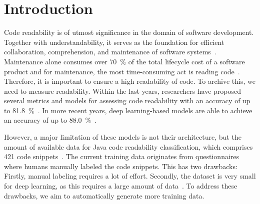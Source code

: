 \documentclass[%
class=scrreprt,
chapterprefix=false,%
open=right,%
twoside=false,%
paper=a4,%
logofile={Logo\_zentral\_farbig\_EN.png},%
thesistype=master,%
UKenglish,%
]{se2thesis}
\theoremstyle{definition}
\newcommand{\citeclassicmodels}{\cite{buse2009learning, posnett2011simpler, dorn2012general, scalabrino2018comprehensive}\xspace}
\newcommand{\citedeepmodels}{\cite{mi2018inception, mi2018improving, sharma2020egan, mi2022towards, mi2022rank, mi2023graph}\xspace}
\newcommand{\citeolddataset}{\cite{buse2009learning, dorn2012general, scalabrino2018comprehensive}\xspace}
\begin{document}
	\mainmatter
	
	\tableofcontents

\pagebreak
\section{Introduction} \label{Introduction}

	Code readability is of utmost significance in the domain of software development.
	Together with understandability, it serves as the foundation for efficient collaboration, comprehension, and maintenance of software systems~\cite{posnett2011simpler, aggarwal2002integrated}. 
	Maintenance alone consumes over 70~\% of the total lifecycle cost of a software product and for maintenance, the most time-consuming act is reading code~\cite{buse2009learning, deimel1985uses, rugaber2000use, boehm2001defect}.
	Therefore, it is important to ensure a high readability of code. To archive this, we need to measure readability.
	Within the last years, researchers have proposed several metrics and models for assessing code readability with an accuracy of up to 81.8~\%~\citeclassicmodels. In more recent years, deep learning-based models are able to achieve an accuracy of up to 88.0~\%~\citedeepmodels.
	
	However, a major limitation of these models is not their architecture, but the amount of available data for Java code readability classification, which comprises 421 code snippets~\citeolddataset. The current training data originates from questionnaires where humans manually labeled the code snippets. This has two drawbacks: Firstly, manual labeling requires a lot of effort.
	Secondly, the dataset is very small for deep learning, as this requires a large amount of data~\cite{hestness2017deep}.
	To address these drawbacks, we aim to automatically generate more training data.
	
	
\end{document}
